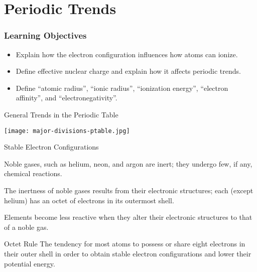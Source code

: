 \documentclass[notes=only]{beamer}
\begin{document}
\section{Periodic Trends}

\begin{frame}
	\frametitle{Learning Objectives}
	\begin{itemize}
		\item Explain how the electron configuration influences how
			atoms can ionize.
	\item Define effective nuclear charge and explain how it affects
		periodic trends.
	\item Define ``atomic radius'', ``ionic radius'', ``ionization energy'', ``electron
		affinity'', and ``electronegativity''.
	\end{itemize}
\end{frame}

\begin{frame}{General Trends in the Periodic Table}
	\begin{center}
		\texttt{[image: major-divisions-ptable.jpg]}
	\end{center}
\end{frame}

\begin{frame}{Stable Electron Configurations}
	\begin{description}[<+->]
		\item[Fact:] Noble gases, such as helium, neon, and argon are
			inert; they undergo few, if any, chemical reactions.
		\item[Theory:] The inertness of noble gases results from their
			electronic structures; each (except helium) has an
			\alert{octet} of electrons in its outermost shell.
		\item[Deduction:] Elements become less reactive when they alter
			their electronic structures to that of a noble gas.
	\end{description}

	\pause[\thebeamerpauses]

	\begin{block}{Octet Rule}
		The tendency for most atoms to possess or share eight electrons
		in their outer shell in order to obtain stable electron
		configurations and lower their potential energy.
	\end{block}
\end{frame}
\end{document}
